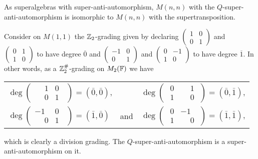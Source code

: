 \begin{remark}
	As superalgebras with super-anti-automorphism, $M(n,n)$ with the $Q$-super-anti-automorphism is isomorphic to $M(n,n)$ with the supertransposition.
\end{remark}

\begin{ex}\label{ex:supertransp-graded-new}
	Consider on $M(1,1)$ the $\mathbb{Z}_2$-grading given by declaring
	$\begin{pmatrix}
			1 & 0 \\
			0 & 1
		\end{pmatrix}$ and
	$\begin{pmatrix}
			0 & 1 \\
			1 & 0
		\end{pmatrix}$ to have degree $\overline 0$ and
	$\begin{pmatrix}
			-1 & 0 \\
			0  & 1
		\end{pmatrix}$ and
	$\begin{pmatrix}
			0 & -1 \\
			1 & 0
		\end{pmatrix}$ to have degree $\overline 1$. In other words, as a $\mathbb{Z}_2^\#$-grading on $M_2(\mathbb{F})$ we have\\
	\begin{center}
		\begin{tabular}{ l c r }
			$\deg \begin{pmatrix}
					\phantom{-}1 & 0\phantom{..} \\
					\phantom{-}0 & 1\phantom{..}
				\end{pmatrix} = (\bar 0, \bar 0)$, &                                                       & $\deg \begin{pmatrix}
					\phantom{.}0 & \phantom{-}1\phantom{.} \\
					\phantom{.}1 & \phantom{-}0\phantom{.}
				\end{pmatrix} = (\bar 0, \bar 1)$, \\
			$\deg \begin{pmatrix}
					-1           & 0\phantom{..} \\
					\phantom{-}0 & 1\phantom{..}
				\end{pmatrix} = (\bar 1, \bar 0)$  &
			and
			                                                      & $\deg \begin{pmatrix}
					\phantom{.}0 & -1\phantom{.}           \\
					\phantom{.}1 & \phantom{-}0\phantom{.}
				\end{pmatrix} = (\bar 1, \bar 1)$,
		\end{tabular}
	\end{center}
	which is clearly a division grading.
	The $Q$-super-anti-automorphism is a super-anti-automorphism on it.
\end{ex}

